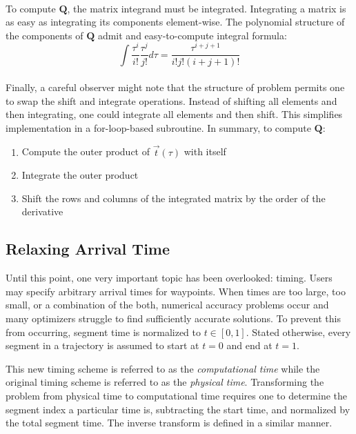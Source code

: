\documentclass[12pt]{article}
\begin{document}
\\
To compute $\mathbf{Q}$, the matrix integrand must be integrated. Integrating a
matrix is as easy as integrating its components element-wise. The polynomial
structure of the components of $\mathbf{Q}$ admit and easy-to-compute integral
formula:
\begin{equation*}
  \int \frac{\tau^{i}}{i!} \frac{\tau^{j}}{j!} d\tau =
  \frac{\tau^{i+j+1}}{i!j!(i+j+1)!}
\end{equation*}
\\
Finally, a careful observer might note that the structure of problem permits one
to swap the shift and integrate operations. Instead of shifting all elements and
then integrating, one could integrate all elements and then shift. This
simplifies implementation in a for-loop-based subroutine.
\bigbreak
\noindent In summary, to compute $\mathbf{Q}$:
\begin{enumerate}
  \item Compute the outer product of $\vec{t}(\tau)$ with itself
  \item Integrate the outer product
  \item Shift the rows and columns of the integrated matrix by the order of the
    derivative
\end{enumerate}

\subsection{Relaxing Arrival Time}
Until this point, one very important topic has been overlooked: timing. Users
may specify arbitrary arrival times for waypoints. When times are too large, too
small, or a combination of the both, numerical accuracy problems occur and many
optimizers struggle to find sufficiently accurate solutions. To prevent this
from occurring, segment time is normalized to $t \in [0,1]$. Stated otherwise,
every segment in a trajectory is assumed to start at $t=0$ and end at $t=1$.


This new timing scheme is referred to as the \textit{computational time} while
the original timing scheme is referred to as the \textit{physical time}.
Transforming the problem from physical time to computational time requires one
to determine the segment index a particular time is, subtracting the start time,
and normalized by the total segment time. The inverse transform is defined in a
similar manner.
\end{document}
